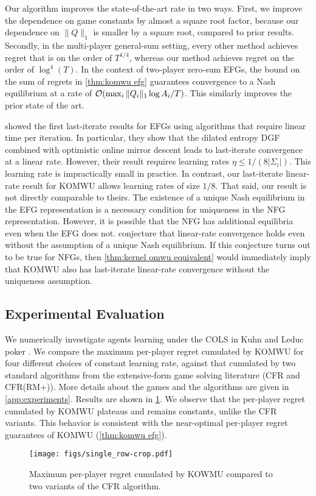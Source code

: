 Our algorithm improves the state-of-the-art rate in two ways.
First, we improve the dependence on game constants by almost a square root factor, because our dependence on $\|Q\|_1$ is smaller by a square root, compared to prior results.
Secondly, in the multi-player general-sum setting, every other method achieves regret that is on the order of $T^{1/4}$, whereas our method achieves regret on the order of $\log^4(T)$.
In the context of two-player zero-sum EFGs, the bound on the sum of regrets in \cref{thm:komwu efg} guarantees convergence to a Nash equilibrium at a rate of $\mathcal{O}(\max_i \|Q_i\|_1\log A_i / T)$.
This similarly improves the prior state of the art.




\citet{Lee21:Last} showed the first last-iterate results for EFGs using algorithms that require linear time per iteration. In particular, they show that the dilated entropy DGF combined with optimistic online mirror descent leads to last-iterate convergence at a linear rate.
However, their result requires learning rates $\eta \leq 1/(8|\Sigma_i|)$. This learning rate is impractically small in practice. In contrast, our last-iterate linear-rate result for KOMWU allows learning rates of size $1/8$.
That said, our result is not directly comparable to theirs. The existence of a unique Nash equilibrium in the EFG representation is a necessary condition for uniqueness in the NFG representation. However, it is possible that the NFG has additional equilibria even when the EFG does not.
\citet{Wei21:Linear} conjecture that linear-rate convergence holds even without the assumption of a unique Nash equilibrium. If this conjecture turns out to be true for NFGs, then \cref{thm:kernel omwu equivalent} would immediately imply that KOMWU also has last-iterate linear-rate convergence without the uniqueness assumption.


\subsection{Experimental Evaluation}
We numerically investigate agents learning under the COLS in Kuhn and Leduc poker \citep{Kuhn50:Simplified,Southey05:Bayes}. %
We compare the maximum per-player regret cumulated by KOMWU for four different choices of constant learning rate, against that cumulated by two standard algorithms from the extensive-form game solving literature (CFR and CFR(RM+)). More details about the games and the algorithms are given in \cref{app:experiments}. Results are shown in \cref{fig:experiments}. We observe that the per-player regret cumulated by KOMWU plateaus and remains constants, unlike the CFR variants. This behavior is consistent with the near-optimal per-player regret guarantees of KOMWU (\cref{thm:komwu efg}).

\begin{figure}[ht]
    \texttt{[image: figs/single\_row-crop.pdf]}
    \vspace{-4mm}
    \caption{Maximum per-player regret cumulated by KOWMU compared to two variants of the CFR algorithm.}
    \label{fig:experiments}
\end{figure}

